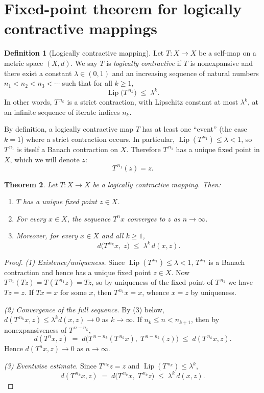 \documentclass[11pt]{article}
\newtheorem{theorem}{Theorem}[section]
\theoremstyle{definition}
\newtheorem{definition}[theorem]{Definition}
\theoremstyle{remark}
\DeclareMathOperator{\Lip}{Lip}
\begin{document}
\section{Fixed-point theorem for logically contractive mappings}
\begin{definition}[Logically contractive mapping]\label{def:logical-contractiveness}
Let $T:X\to X$ be a self-map on a metric space $(X,d)$. We say $T$ is \emph{logically contractive} if $T$ is nonexpansive and there exist a constant $\lambda \in (0,1)$ and an increasing sequence of natural numbers $n_1<n_2<n_3<\cdots$ such that for all $k\ge 1$,
\[
\Lip\!\big(T^{\,n_k}\big) \;\le\; \lambda^k.
\]
In other words, $T^{\,n_k}$ is a strict contraction, with Lipschitz constant at most $\lambda^k$, at an infinite sequence of iterate indices $n_k$.
\end{definition}

By definition, a logically contractive map $T$ has at least one ``event'' (the case $k=1$) where a strict contraction occurs. In particular, $\Lip(T^{\,n_1}) \le \lambda < 1$, so $T^{\,n_1}$ is itself a Banach contraction on $X$. Therefore $T^{\,n_1}$ has a unique fixed point in $X$, which we will denote $z$:
\[
T^{\,n_1}(z) = z.
\]

\begin{theorem}\label{thm:fixedpoint}
Let $T:X\to X$ be a logically contractive mapping. Then:
\begin{enumerate}
\item $T$ has a unique fixed point $z\in X$.
\item For every $x\in X$, the sequence $T^n x$ converges to $z$ as $n\to\infty$.
\item Moreover, for every $x\in X$ and all $k\ge1$,
\[
d\!\big(T^{\,n_k}x,\;z\big) \;\le\; \lambda^k\, d(x,z).
\]
\end{enumerate}
\end{theorem}

\begin{proof}
\emph{(1) Existence/uniqueness.}
Since $\Lip(T^{\,n_1})\le \lambda<1$, $T^{\,n_1}$ is a Banach contraction and hence has a unique fixed point $z\in X$. Now $T^{\,n_1}(Tz)=T(T^{\,n_1}z)=Tz$, so by uniqueness of the fixed point of $T^{\,n_1}$ we have $Tz=z$. If $Tx=x$ for some $x$, then $T^{\,n_1}x=x$, whence $x=z$ by uniqueness.

\emph{(2) Convergence of the full sequence.}
By (3) below, $d(T^{\,n_k}x,z)\le \lambda^k d(x,z)\to 0$ as $k\to\infty$. If $n_k\le n < n_{k+1}$, then by nonexpansiveness of $T^{\,n-n_k}$,
\[
d(T^n x,z) \;=\; d\!\big(T^{\,n-n_k}(T^{\,n_k}x),\;T^{\,n-n_k}(z)\big)\;\le\; d(T^{\,n_k}x,z).
\]
Hence $d(T^n x,z)\to 0$ as $n\to\infty$.

\emph{(3) Eventwise estimate.}
Since $T^{\,n_k}z=z$ and $\Lip(T^{\,n_k})\le \lambda^k$,
\[
d(T^{\,n_k}x,z)\;=\; d\!\big(T^{\,n_k}x,\;T^{\,n_k}z\big)\;\le\; \lambda^k\, d(x,z).
\]
\end{proof}
\end{document}
